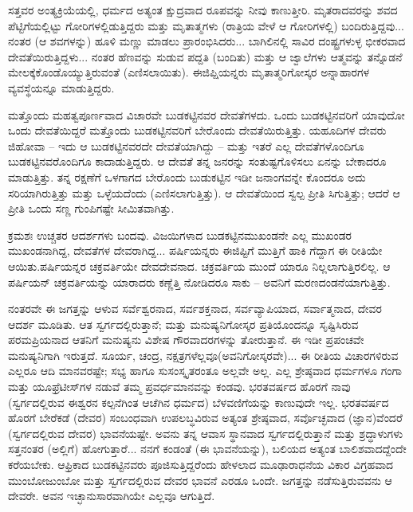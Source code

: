 ಸತ್ತವರ ಅಂತ್ಯಕ್ರಿಯೆಯಲ್ಲಿ, ಧರ್ಮದ ಅತ್ಯಂತ ಕ್ಷುದ್ರವಾದ ರೂಪವನ್ನು ನೀವು ಕಾಣುತ್ತೀರಿ. ಮೃತರಾದವರನ್ನು ಶವದ ಪೆಟ್ಟಿಗೆಯಲ್ಲಿಟ್ಟು ಗೋರಿಗಳಲ್ಲಿಡುತ್ತಿದ್ದರು ಮತ್ತು ಮೃತಾತ್ಮಗಳು (ರಾತ್ರಿಯ ವೇಳೆ ಆ ಗೋರಿಗಳಲ್ಲಿ) ಬಂದಿರುತ್ತಿದ್ದವು... ನಂತರ (ಆ ಶವಗಳನ್ನು) ಹೂಳಿ ಮಣ್ಣು ಮಾಡಲು ಪ್ರಾರಂಭಿಸಿದರು... ಬಾಗಿಲಿನಲ್ಲಿ ಸಾವಿರ ದಂಷ್ಟ್ರಗಳುಳ್ಳ ಭೀಕರವಾದ ದೇವತೆಯಿರುತ್ತಿದ್ದಳು... ನಂತರ ಹೆಣವನ್ನು ಸುಡುವ ಪದ್ದತಿ (ಬಂದಿತು) ಮತ್ತು ಆ ಜ್ವಾಲೆಗಳು ಆತ್ಮವನ್ನು ತನ್ನೊಡನೆ ಮೇಲಕ್ಕೆ\break ಕೊಂಡೊಯ್ಯುತ್ತಿರುವಂತೆ (ಎಣಿಸಲಾಯಿತು). ಈಜಿಪ್ಷಿಯನ್ನರು ಮೃತಾತ್ಮರಿಗೋಸ್ಕರ ಅನ್ನಾಹಾರಗಳ ವ್ಯವಸ್ಥೆಯನ್ನೂ ಮಾಡುತ್ತಿದ್ದರು.

ಮತ್ತೊಂದು ಮಹತ್ವಪೂರ್ಣವಾದ ವಿಚಾರವೇ ಬುಡಕಟ್ಟಿನವರ ದೇವತೆಗಳದು. ಒಂದು ಬುಡಕಟ್ಟಿನವರಿಗೆ ಯಾವುದೋ ಒಂದು ದೇವತೆಯಿದ್ದರೆ ಮತ್ತೊಂದು ಬುಡಕಟ್ಟಿನವರಿಗೆ ಬೇರೊಂದು ದೇವತೆಯಿರುತ್ತಿತ್ತು. ಯಹೂದಿಗಳ ದೇವರು ಜಿಹೋವಾ – ಇದು ಆ ಬುಡಕಟ್ಟಿನವರದೇ ದೇವತೆಯಾಗಿದ್ದು – ಮತ್ತು ಇತರೆ ಎಲ್ಲ ದೇವತೆಗಳೊಂದಿಗೂ ಬುಡಕಟ್ಟಿನವರೊಂದಿಗೂ ಕಾದಾಡುತ್ತಿದ್ದರು. ಆ ದೇವತೆ ತನ್ನ ಜನರನ್ನು ಸಂತುಷ್ಟಗೊಳಿಸಲು ಏನನ್ನು ಬೇಕಾದರೂ ಮಾಡುತ್ತಿತ್ತು. ತನ್ನ ರಕ್ಷಣೆಗೆ ಒಳಗಾಗದ ಬೇರೊಂದು ಬುಡುಕಟ್ಟಿನ ಇಡೀ ಜನಾಂಗವನ್ನೇ ಕೊಂದರೂ ಅದು ಸರಿಯಾಗಿರುತ್ತಿತ್ತು ಮತ್ತು ಒಳ್ಳೆಯದೆಂದು (ಎಣಿಸಲಾಗುತ್ತಿತ್ತು). ಆ ದೇವತೆಯಿಂದ ಸ್ವಲ್ಪ ಪ್ರೀತಿ ಸಿಗುತ್ತಿತ್ತು; ಆದರೆ ಆ ಪ್ರೀತಿ ಒಂದು ಸಣ್ಣ ಗುಂಪಿಗಷ್ಟೇ ಸೀಮಿತವಾಗಿತ್ತು.

ಕ್ರಮಶಃ ಉಚ್ಚತರ ಆದರ್ಶಗಳು ಬಂದವು. ವಿಜಯಿಗಳಾದ ಬುಡಕಟ್ಟಿನ\break ಮುಖಂಡನೇ ಎಲ್ಲ ಮುಖಂಡರ ಮುಖಂಡನಾಗಿದ್ದ, ದೇವತೆಗಳ ದೇವರಾಗಿದ್ದ... ಪರ್ಷಿಯನ್ನರು ಈಜಿಪ್ಟಿಗೆ ಮುತ್ತಿಗೆ ಹಾಕಿ ಗೆದ್ದಾಗ ಈ ರೀತಿಯೇ ಆಯಿತು.\break ಪರ್ಷಿಯನ್ನರ ಚಕ್ರವರ್ತಿಯೇ ದೇವದೇವನಾದ. ಚಕ್ರವರ್ತಿಯ ಮುಂದೆ ಯಾರೂ ನಿಲ್ಲಲಾಗುತ್ತಿರಲಿಲ್ಲ. ಆ ಪರ್ಷಿಯನ್ ಚಕ್ರವರ್ತಿಯನ್ನು ಯಾರಾದರು ಕಣ್ಣೆತ್ತಿ ನೋಡಿದರೂ ಸಾಕು – ಅವನಿಗೆ ಮರಣದಂಡನೆಯಾಗುತ್ತಿತ್ತು.

ನಂತರವೇ ಈ ಜಗತ್ತನ್ನು ಆಳುವ ಸರ್ವೆಶ್ವರನಾದ, ಸರ್ವಶಕ್ತನಾದ, ಸರ್ವವ್ಯಾಪಿಯಾದ, ಸರ್ವಾತ್ಮನಾದ, ದೇವರ ಆದರ್ಶ ಮೂಡಿತು. ಆತ ಸ್ವರ್ಗದಲ್ಲಿರುತ್ತಾನೆ; ಮತ್ತು ಮನುಷ್ಯನಿಗೋಸ್ಕರ ಪ್ರತಿಯೊಂದನ್ನೂ ಸೃಷ್ಟಿಸಿರುವ ಪರಮಪ್ರಿಯನಾದ ಆತನಿಗೆ ಮನುಷ್ಯನು ವಿಶೇಷ ಗೌರವಾದರಗಳನ್ನು ತೋರುತ್ತಾನೆ. ಈ ಇಡೀ ಪ್ರಪಂಚವೇ ಮನುಷ್ಯನಿಗಾಗಿ ಇರುತ್ತದೆ. ಸೂರ್ಯ, ಚಂದ್ರ, ನಕ್ಷತ್ರಗಳೆಲ್ಲವೂ\break (ಅವನಿಗೋಸ್ಕರವೇ)... ಈ ರೀತಿಯ ವಿಚಾರಗಳಿರುವ ಎಲ್ಲರೂ ಆದಿ ಮಾನವರಷ್ಟೇ; ಸಭ್ಯ ಹಾಗೂ ಸುಸಂಸ್ಕೃತರಂತೂ ಅಲ್ಲವೇ ಅಲ್ಲ. ಎಲ್ಲ ಶ್ರೇಷ್ಠವಾದ ಧರ್ಮಗಳೂ ಗಂಗಾ ಮತ್ತು ಯೂಫ್ರೆಟೀಸ್‌ಗಳ ನಡುವೆ ತಮ್ಮ ಪ್ರವರ್ಧಮಾನವನ್ನು ಕಂಡವು. ಭರತವರ್ಷದ ಹೊರಗೆ ನಾವು (ಸ್ವರ್ಗದಲ್ಲಿರುವ ಈಶ್ವರನ ಕಲ್ಪನೆಗಿಂತ ಆಚೆಗಿನ ಧರ್ಮದ) ಬೆಳವಣಿಗೆಯನ್ನು ಕಾಣುವುದೇ ಇಲ್ಲ. ಭರತವರ್ಷದ ಹೊರಗೆ ಬೇರೆಕಡೆ (ದೇವರ) ಸಂಬಂಧವಾಗಿ ಉಪಲಬ್ಧವಿರುವ ಅತ್ಯಂತ ಶ್ರೇಷ್ಠವಾದ, ಸರ್ವೊಚ್ಛವಾದ (ಜ್ಞಾನ)ವೆಂದರೆ (ಸ್ವರ್ಗದಲ್ಲಿರುವ ದೇವರ) ಭಾವನೆಯಷ್ಟೇ. ಅವನು ತನ್ನ ಆವಾಸ ಸ್ಥಾನವಾದ ಸ್ವರ್ಗದಲ್ಲಿರುತ್ತಾನೆ ಮತ್ತು ಶ್ರದ್ಧಾಳುಗಳು ಸತ್ತನಂತರ (ಅಲ್ಲಿಗೆ) ಹೋಗುತ್ತಾರೆ... ನನಗೆ ಕಂಡಂತೆ (ಈ ಭಾವನೆಯನ್ನು), ಬಲಿಯದ ಅತ್ಯಂತ ಬಾಲಿಶವಾದದ್ದೆಂದೇ ಕರೆಯಬೇಕು. ಆಫ್ರಿಕಾದ ಬುಡಕಟ್ಟಿನವರು ಪೂಜಿಸುತ್ತಿದ್ದರೆಂದು ಹೇಳಲಾದ ಮೂಢಾರಾಧನೆಯ ವಿಕಾರ ವಿಗ್ರಹವಾದ ಮುಂಬೋಜುಂಬೋ ಮತ್ತು ಸ್ವರ್ಗದಲ್ಲಿರುವ ದೇವರ ಭಾವನೆ ಎರಡೂ ಒಂದೇ. ಜಗತ್ತನ್ನು ನಡೆಸುತ್ತಿರುವವನು ಆ ದೇವರೇ. ಅವನ ಇಚ್ಛಾನುಸಾರವಾಗಿಯೇ ಎಲ್ಲವೂ ಆಗುತ್ತಿದೆ.


